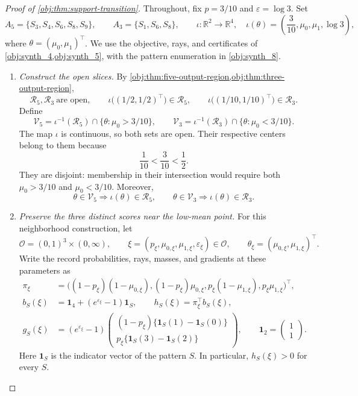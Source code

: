 \documentclass[11pt]{article}
\begin{document}
\begin{proof}[Proof of \cref{obj:thm:support-transition}]
Throughout, fix \(p=3/10\) and \(\varepsilon=\log 3\). Set
\[
A_5=\{S_3,S_4,S_6,S_8,S_9\},
\qquad
A_3=\{S_1,S_6,S_8\},
\qquad
\iota:\mathbb R^2\longrightarrow\mathbb R^4,
\quad
\iota(\theta)=\left(\frac3{10},\mu_0,\mu_1,\log 3\right),
\]
where \(\theta=(\mu_0,\mu_1)^\top\). We use the objective, rays, and certificates of
\cref{obj:synth_4,obj:synth_5}, with the pattern enumeration in
\cref{obj:synth_8}.

\begin{enumerate}
\item \emph{Construct the open slices.}
By \cref{obj:thm:five-output-region,obj:thm:three-output-region},
\[
\mathcal R_5,\mathcal R_3\ \text{are open},\qquad
\iota\bigl((1/2,1/2)^\top\bigr)\in\mathcal R_5,
\qquad
\iota\bigl((1/10,1/10)^\top\bigr)\in\mathcal R_3.
\]
Define
\[
\mathcal V_5
=\iota^{-1}(\mathcal R_5)\cap\{\theta:\mu_0>3/10\},
\qquad
\mathcal V_3
=\iota^{-1}(\mathcal R_3)\cap\{\theta:\mu_0<3/10\}.
\]
The map \(\iota\) is continuous, so both sets are open. Their respective centers belong to them because
\[
\frac1{10}<\frac3{10}<\frac12.
\]
They are disjoint: membership in their intersection would require both
\(\mu_0>3/10\) and \(\mu_0<3/10\). Moreover,
\[
\theta\in\mathcal V_5\Longrightarrow\iota(\theta)\in\mathcal R_5,
\qquad
\theta\in\mathcal V_3\Longrightarrow\iota(\theta)\in\mathcal R_3.
\]

\item \emph{Preserve the three distinct scores near the low-mean point.}
For this neighborhood construction, let
\[
\mathcal O=(0,1)^3\times(0,\infty),\qquad
\xi=(p_\xi,\mu_{0,\xi},\mu_{1,\xi},\varepsilon_\xi)\in\mathcal O,
\qquad
\theta_\xi=(\mu_{0,\xi},\mu_{1,\xi})^\top.
\]
Write the record probabilities, rays, masses, and gradients at these parameters as
\[
\begin{aligned}
\pi_\xi&=\bigl((1-p_\xi)(1-\mu_{0,\xi}),
 (1-p_\xi)\mu_{0,\xi},
 p_\xi(1-\mu_{1,\xi}),p_\xi\mu_{1,\xi}\bigr)^\top,\\
b_S(\xi)&=\mathbf1_4+(e^{\varepsilon_\xi}-1)\mathbf1_S,
\qquad h_S(\xi)=\pi_\xi^\top b_S(\xi),\\
g_S(\xi)&=(e^{\varepsilon_\xi}-1)
\begin{pmatrix}
(1-p_\xi)\{\mathbf1_S(1)-\mathbf1_S(0)\}\\
p_\xi\{\mathbf1_S(3)-\mathbf1_S(2)\}
\end{pmatrix},
\qquad
\mathbf1_2=\begin{pmatrix}1\\1\end{pmatrix}.
\end{aligned}
\]
Here \(\mathbf1_S\) is the indicator vector of the pattern \(S\). In particular,
\(h_S(\xi)>0\) for every \(S\).


\end{enumerate}
\end{proof}
\end{document}
